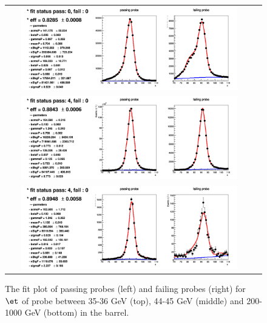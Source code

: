 \begin{figure}[bh]
  \begin{center}
    \begin{tabular}{cc}
      \includegraphics[width=0.9\textwidth]{figures/Zprime/2017/ScaleFactor/Fit_method/Run2017BCDEF_barrel_Et_DYToEE_amc/passingHEEP/plots/data_Run2017B/nominalFit/bin00_p_eta_abs_0p00To1p44_p_Et_35p00To36p00.png} \\
      \includegraphics[width=0.9\textwidth]{figures/Zprime/2017/ScaleFactor/Fit_method/Run2017BCDEF_barrel_Et_DYToEE_amc/passingHEEP/plots/data_Run2017B/nominalFit/bin09_p_eta_abs_0p00To1p44_p_Et_44p00To45p00.png} \\
      \includegraphics[width=0.9\textwidth]{figures/Zprime/2017/ScaleFactor/Fit_method/Run2017BCDEF_barrel_Et_DYToEE_amc/passingHEEP/plots/data_Run2017B/nominalFit/bin30_p_eta_abs_0p00To1p44_p_Et_200p00To1000p00.png} \\
    \end{tabular}
    \caption{The fit plot of passing probes (left) and failing probes (right) for $\et$ of probe between 35-36 GeV (top), 44-45 GeV (middle) and 200-1000 GeV (bottom) in the barrel.}
    \label{fig:fit_probe_barrel}
  \end{center}
\end{figure}

